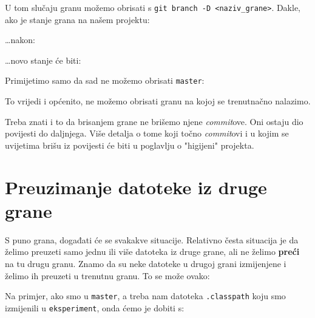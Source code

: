 U tom slučaju granu možemo obrisati s \verb+git branch -D <naziv_grane>+. 
Dakle, ako je stanje grana na našem projektu:



\dots{}nakon:



\dots{}novo stanje će biti:



Primijetimo samo da sad ne možemo obrisati \verb+master+:



To vrijedi i općenito, ne možemo obrisati granu na kojoj se trenutnačno nalazimo.

Treba znati i to da brisanjem grane ne brišemo njene \emph{commit}ove.
Oni ostaju dio povijesti do daljnjega.
Više detalja o tome koji točno \emph{commit}ovi i u kojim se uvijetima brišu iz povijesti će biti u poglavlju o "higijeni" projekta.

\section*{Preuzimanje datoteke iz druge grane}

S puno grana, događati će se svakakve situacije.
Relativno česta situacija je da želimo preuzeti samo jednu ili više datoteka iz druge grane, ali ne želimo \textbf{preći} na tu drugu granu.
Znamo da su neke datoteke u drugoj grani izmijenjene i želimo ih preuzeti u trenutnu granu.
To se može ovako:


Na primjer, ako smo u \verb+master+, a treba nam datoteka \verb+.classpath+ koju smo izmijenili u \verb+eksperiment+, onda ćemo je dobiti s:


